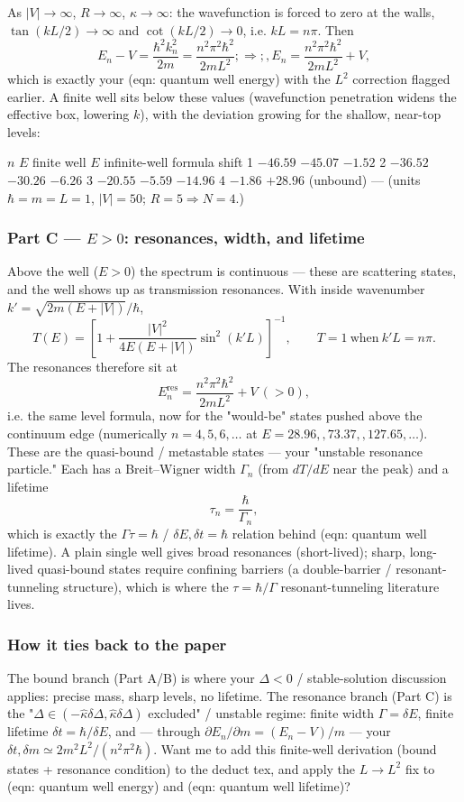 \documentclass[twoside]{article}
\numberwithin{equation}{section}
\begin{document}
As $|V|\to\infty$, $R\to\infty$, $\kappa\to\infty$: the wavefunction is forced to zero at the walls, $\tan(kL/2)\to\infty$ and $\cot(kL/2)\to0$, i.e. $kL=n\pi$. Then
$$E_n-V=\frac{\hbar^2k_n^2}{2m}=\frac{n^2\pi^2\hbar^2}{2mL^2};\Longrightarrow;\boxed{,E_n=\frac{n^2\pi^2\hbar^2}{2mL^2}+V,}$$
which is exactly your (eqn: quantum well energy) with the $L^2$ correction flagged earlier. A finite well sits below these values (wavefunction penetration widens the effective box, lowering $k$), with the deviation growing for the shallow, near-top levels:

$n$	$E$ finite well	$E$ infinite-well formula	shift
1	$-46.59$	$-45.07$	$-1.52$
2	$-36.52$	$-30.26$	$-6.26$
3	$-20.55$	$-5.59$	$-14.96$
4	$-1.86$	$+28.96$ (unbound)	—
(units $\hbar=m=L=1$, $|V|=50$; $R=5\Rightarrow N=4$.)

\subsubsection{Part C — $E>0$: resonances, width, and lifetime}

Above the well ($E>0$) the spectrum is continuous — these are scattering states, and the well shows up as transmission resonances. With inside wavenumber $k'=\sqrt{2m(E+|V|)}/\hbar$,
$$T(E)=\left[1+\frac{|V|^2}{4E(E+|V|)}\sin^2(k'L)\right]^{-1},\qquad T=1\ \text{when}\ k'L=n\pi .$$
The resonances therefore sit at
$$E_n^{\text{res}}=\frac{n^2\pi^2\hbar^2}{2mL^2}+V\ (>0),$$
i.e. the same level formula, now for the "would-be" states pushed above the continuum edge (numerically $n=4,5,6,\dots$ at $E=28.96,,73.37,,127.65,\dots$). These are the quasi-bound / metastable states — your "unstable resonance particle." Each has a Breit–Wigner width $\Gamma_n$ (from $dT/dE$ near the peak) and a lifetime
$$\tau_n=\frac{\hbar}{\Gamma_n},$$
which is exactly the $\Gamma\tau=\hbar$ / $\delta E,\delta t=\hbar$ relation behind (eqn: quantum well lifetime). A plain single well gives broad resonances (short-lived); sharp, long-lived quasi-bound states require confining barriers (a double-barrier / resonant-tunneling structure), which is where the $\tau=\hbar/\Gamma$ resonant-tunneling literature lives.

\subsubsection{How it ties back to the paper}

The bound branch (Part A/B) is where your $\Delta<0$ / stable-solution discussion applies: precise mass, sharp levels, no lifetime.
The resonance branch (Part C) is the "$\Delta\in(-\hat\kappa\delta\Delta,\hat\kappa\delta\Delta)$ excluded" / unstable regime: finite width $\Gamma=\delta E$, finite lifetime $\delta t=\hbar/\delta E$, and — through $\partial E_n/\partial m=(E_n-V)/m$ — your $\delta t,\delta m\simeq 2m^2L^2/(n^2\pi^2\hbar)$.
Want me to add this finite-well derivation (bound states + resonance condition) to the deduct tex, and apply the $L\to L^2$ fix to (eqn: quantum well energy) and (eqn: quantum well lifetime)?
\end{document}

